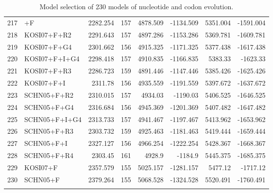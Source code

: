\documentclass[12pt]{article}
\begin{document}
\begin{longtable}{clrrrrrr}
	217 & \gy+F & 2282.254 & 157 & 4878.509 & -1134.509 & 5351.004 & -1591.004 \\ 
	218 & KOSI07+F+R2 & 2291.643 & 157 & 4897.286 & -1153.286 & 5369.781 & -1609.781 \\ 
	219 & KOSI07+F+G4 & 2301.662 & 156 & 4915.325 & -1171.325 & 5377.438 & -1617.438 \\ 
	220 & KOSI07+F+I+G4 & 2298.418 & 157 & 4910.835 & -1166.835 & 5383.33 & -1623.33 \\ 
	221 & KOSI07+F+R3 & 2286.723 & 159 & 4891.446 & -1147.446 & 5385.426 & -1625.426 \\ 
	222 & KOSI07+F+I & 2311.78 & 156 & 4935.559 & -1191.559 & 5397.672 & -1637.672 \\ 
	223 & SCHN05+F+R2 & 2310.015 & 157 & 4934.03 & -1190.03 & 5406.525 & -1646.525 \\ 
	224 & SCHN05+F+G4 & 2316.684 & 156 & 4945.369 & -1201.369 & 5407.482 & -1647.482 \\ 
	225 & SCHN05+F+I+G4 & 2313.733 & 157 & 4941.467 & -1197.467 & 5413.962 & -1653.962 \\ 
	226 & SCHN05+F+R3 & 2303.732 & 159 & 4925.463 & -1181.463 & 5419.444 & -1659.444 \\ 
	227 & SCHN05+F+I & 2327.127 & 156 & 4966.254 & -1222.254 & 5428.367 & -1668.367 \\ 
	228 & SCHN05+F+R4 & 2303.45 & 161 & 4928.9 & -1184.9 & 5445.375 & -1685.375 \\ 
	229 & KOSI07+F & 2357.579 & 155 & 5025.157 & -1281.157 & 5477.12 & -1717.12 \\ 
	230 & SCHN05+F & 2379.264 & 155 & 5068.528 & -1324.528 & 5520.491 & -1760.491 \\ 
  \caption{Model selection of 230 models of nucleotide and codon evolution.}
  \label{tab:AIC_full}
\end{longtable}
\end{document}
